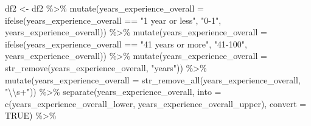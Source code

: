 \documentclass[
]{article}
\newenvironment{Shaded}{\begin{snugshade}}{\end{snugshade}}
\newcommand{\AttributeTok}[1]{\textcolor[rgb]{0.77,0.63,0.00}{#1}}
\newcommand{\ConstantTok}[1]{\textcolor[rgb]{0.00,0.00,0.00}{#1}}
\newcommand{\FunctionTok}[1]{\textcolor[rgb]{0.00,0.00,0.00}{#1}}
\newcommand{\NormalTok}[1]{#1}
\newcommand{\OtherTok}[1]{\textcolor[rgb]{0.56,0.35,0.01}{#1}}
\newcommand{\SpecialCharTok}[1]{\textcolor[rgb]{0.00,0.00,0.00}{#1}}
\newcommand{\StringTok}[1]{\textcolor[rgb]{0.31,0.60,0.02}{#1}}
\begin{document}
\begin{Shaded}
\begin{Highlighting}[]
\NormalTok{df2 }\OtherTok{\textless{}{-}}\NormalTok{ df2 }\SpecialCharTok{\%\textgreater{}\%}
        \FunctionTok{mutate}\NormalTok{(}\AttributeTok{years\_experience\_overall =} 
                   \FunctionTok{ifelse}\NormalTok{(years\_experience\_overall }\SpecialCharTok{==} \StringTok{"1 year or less"}\NormalTok{, }\StringTok{"0{-}1"}\NormalTok{, years\_experience\_overall)) }\SpecialCharTok{\%\textgreater{}\%}
        \FunctionTok{mutate}\NormalTok{(}\AttributeTok{years\_experience\_overall =} 
                   \FunctionTok{ifelse}\NormalTok{(years\_experience\_overall }\SpecialCharTok{==} \StringTok{"41 years or more"}\NormalTok{, }\StringTok{"41{-}100"}\NormalTok{, years\_experience\_overall)) }\SpecialCharTok{\%\textgreater{}\%}
        \FunctionTok{mutate}\NormalTok{(}\AttributeTok{years\_experience\_overall =} \FunctionTok{str\_remove}\NormalTok{(years\_experience\_overall, }\StringTok{"years"}\NormalTok{)) }\SpecialCharTok{\%\textgreater{}\%}
        \FunctionTok{mutate}\NormalTok{(}\AttributeTok{years\_experience\_overall =} \FunctionTok{str\_remove\_all}\NormalTok{(years\_experience\_overall, }\StringTok{"}\SpecialCharTok{\textbackslash{}\textbackslash{}}\StringTok{s+"}\NormalTok{)) }\SpecialCharTok{\%\textgreater{}\%}
        \FunctionTok{separate}\NormalTok{(years\_experience\_overall, }\AttributeTok{into =} \FunctionTok{c}\NormalTok{(}\StringTok{\textquotesingle{}years\_experience\_overall\_lower\textquotesingle{}}\NormalTok{, }\StringTok{\textquotesingle{}years\_experience\_overall\_upper\textquotesingle{}}\NormalTok{), }\AttributeTok{convert =} \ConstantTok{TRUE}\NormalTok{) }\SpecialCharTok{\%\textgreater{}\%}


\end{Highlighting}
\end{Shaded}
\end{document}
